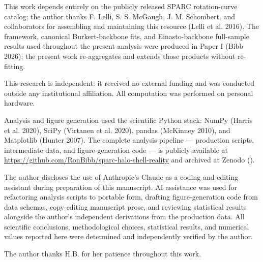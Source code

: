 \documentclass[linenumbers,trackchanges]{aastex701}
\begin{document}
\begin{acknowledgments}

This work depends entirely on the publicly released SPARC rotation-curve catalog; the author thanks F. Lelli, S. S. McGaugh, J. M. Schombert, and collaborators for assembling and maintaining this resource (Lelli et al. 2016). The framework, canonical Burkert-backbone fits, and Einasto-backbone full-sample results used throughout the present analysis were produced in Paper I (Bibb 2026); the present work re-aggregates and extends those products without re-fitting.

This research is independent: it received no external funding and was conducted outside any institutional affiliation. All computation was performed on personal hardware.

Analysis and figure generation used the scientific Python stack: NumPy (Harris et al. 2020), SciPy (Virtanen et al. 2020), pandas (McKinney 2010), and Matplotlib (Hunter 2007). The complete analysis pipeline --- production scripts, intermediate data, and figure-generation code --- is publicly available at \url{https://github.com/RonBibb/sparc-halo-shell-reality} and archived at Zenodo ().

The author discloses the use of Anthropic's Claude as a coding and editing assistant during preparation of this manuscript. AI assistance was used for refactoring analysis scripts to portable form, drafting figure-generation code from data schemas, copy-editing manuscript prose, and reviewing statistical results alongside the author's independent derivations from the production data. All scientific conclusions, methodological choices, statistical results, and numerical values reported here were determined and independently verified by the author.

The author thanks H.B. for her patience throughout this work.

\end{acknowledgments}





\end{document}
